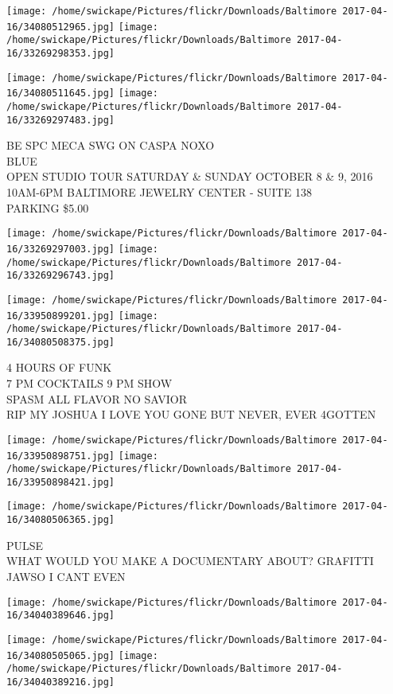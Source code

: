 \documentclass[10pt,letterpaper]{article}
\begin{document}
\texttt{[image: /home/swickape/Pictures/flickr/Downloads/Baltimore 2017-04-16/34080512965.jpg]}
\texttt{[image: /home/swickape/Pictures/flickr/Downloads/Baltimore 2017-04-16/33269298353.jpg]}

\texttt{[image: /home/swickape/Pictures/flickr/Downloads/Baltimore 2017-04-16/34080511645.jpg]}
\texttt{[image: /home/swickape/Pictures/flickr/Downloads/Baltimore 2017-04-16/33269297483.jpg]}

BE SPC MECA SWG ON CASPA NOXO\\
BLUE\\
OPEN STUDIO TOUR SATURDAY \& SUNDAY OCTOBER 8 \& 9, 2016 10AM{-}6PM BALTIMORE JEWELRY CENTER {-} SUITE 138\\
PARKING \$5.00
\pagebreak

\texttt{[image: /home/swickape/Pictures/flickr/Downloads/Baltimore 2017-04-16/33269297003.jpg]}
\texttt{[image: /home/swickape/Pictures/flickr/Downloads/Baltimore 2017-04-16/33269296743.jpg]}

\texttt{[image: /home/swickape/Pictures/flickr/Downloads/Baltimore 2017-04-16/33950899201.jpg]}
\texttt{[image: /home/swickape/Pictures/flickr/Downloads/Baltimore 2017-04-16/34080508375.jpg]}

4 HOURS OF FUNK\\
7 PM COCKTAILS 9 PM SHOW\\
SPASM ALL FLAVOR NO SAVIOR\\
RIP MY JOSHUA I LOVE YOU GONE BUT NEVER, EVER 4GOTTEN
\pagebreak

\texttt{[image: /home/swickape/Pictures/flickr/Downloads/Baltimore 2017-04-16/33950898751.jpg]}
\texttt{[image: /home/swickape/Pictures/flickr/Downloads/Baltimore 2017-04-16/33950898421.jpg]}

\texttt{[image: /home/swickape/Pictures/flickr/Downloads/Baltimore 2017-04-16/34080506365.jpg]}

PULSE\\
WHAT WOULD YOU MAKE A DOCUMENTARY ABOUT?  GRAFITTI\\
JAWSO I CANT EVEN
\pagebreak

\texttt{[image: /home/swickape/Pictures/flickr/Downloads/Baltimore 2017-04-16/34040389646.jpg]}

\vspace{0.25in}
\texttt{[image: /home/swickape/Pictures/flickr/Downloads/Baltimore 2017-04-16/34080505065.jpg]}
\texttt{[image: /home/swickape/Pictures/flickr/Downloads/Baltimore 2017-04-16/34040389216.jpg]}
\end{document}
